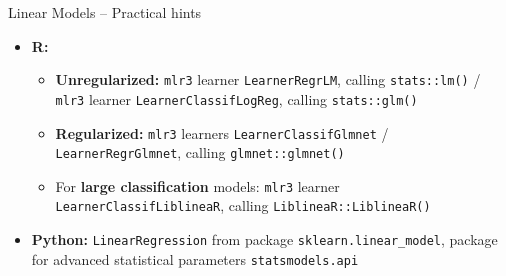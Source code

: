 \begin{frame}{Linear Models -- Practical hints}


\begin{itemize}
  \item \textbf{R:}
  \begin{itemize}
    \item \textbf{Unregularized:} \texttt{mlr3} learner \texttt{LearnerRegrLM}, 
    calling \texttt{stats::lm()} / \texttt{mlr3} learner 
    \texttt{LearnerClassifLogReg}, calling \texttt{stats::glm()}
    \item \textbf{Regularized:} \texttt{mlr3} learners 
    \texttt{LearnerClassifGlmnet} / 
    \texttt{LearnerRegrGlmnet}, calling \texttt{glmnet::glmnet()}
    \item For \textbf{large classification} models: \texttt{mlr3} learner     
    \texttt{LearnerClassifLiblineaR}, calling \texttt{LiblineaR::LiblineaR()}
  \end{itemize}
  \item \textbf{Python:} \texttt{LinearRegression} from package 
  \texttt{sklearn.linear\_model}, package for advanced statistical parameters 
  \texttt{statsmodels.api} 
\end{itemize}


\end{frame}



